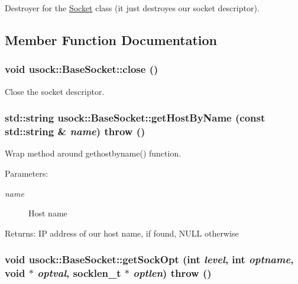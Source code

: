 Destroyer for the \hyperlink{classusock_1_1Socket}{Socket} class (it just destroyes our socket descriptor). 



\subsection{Member Function Documentation}
\hypertarget{classusock_1_1BaseSocket_06383c7ad352244fb0e5e6276e5e86c2}{
\subsubsection[{close}]{\setlength{\rightskip}{0pt plus 5cm}void usock::BaseSocket::close ()}}
\label{classusock_1_1BaseSocket_06383c7ad352244fb0e5e6276e5e86c2}


Close the socket descriptor. 

\hypertarget{classusock_1_1BaseSocket_7ffc3a11be4a9d7ba72a1f66f3dbad68}{
\subsubsection[{getHostByName}]{\setlength{\rightskip}{0pt plus 5cm}std::string usock::BaseSocket::getHostByName (const std::string \& {\em name})  throw ()}}
\label{classusock_1_1BaseSocket_7ffc3a11be4a9d7ba72a1f66f3dbad68}


Wrap method around gethostbyname() function. 

\begin{Desc}
\item[Parameters:]
\begin{description}
\item[{\em name}]Host name \end{description}
\end{Desc}
\begin{Desc}
\item[Returns:]IP address of our host name, if found, NULL otherwise \end{Desc}
\hypertarget{classusock_1_1BaseSocket_87925e8c3b89a50f8c8c2a68e0d2ab70}{
\subsubsection[{getSockOpt}]{\setlength{\rightskip}{0pt plus 5cm}void usock::BaseSocket::getSockOpt (int {\em level}, \/  int {\em optname}, \/  void $\ast$ {\em optval}, \/  socklen\_\-t $\ast$ {\em optlen})  throw ()}}
\label{classusock_1_1BaseSocket_87925e8c3b89a50f8c8c2a68e0d2ab70}


